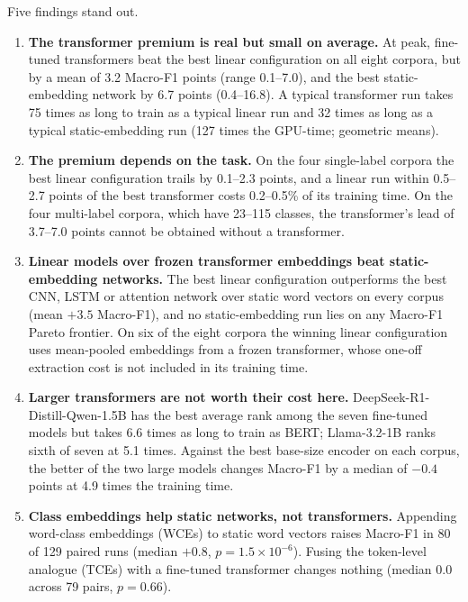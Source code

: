 \documentclass{ijis}
\begin{document}
Five findings stand out.
\begin{enumerate}
\setlength\itemsep{1pt}
\item \textbf{The transformer premium is real but small on average.} At peak, fine-tuned transformers beat the best linear configuration on all eight corpora, but by a mean of 3.2 Macro-F1 points (range 0.1--7.0), and the best static-embedding network by 6.7 points (0.4--16.8). A typical transformer run takes 75 times as long to train as a typical linear run and 32 times as long as a typical static-embedding run (127 times the GPU-time; geometric means).
\item \textbf{The premium depends on the task.} On the four single-label corpora the best linear configuration trails by 0.1--2.3 points, and a linear run within 0.5--2.7 points of the best transformer costs 0.2--0.5\% of its training time. On the four multi-label corpora, which have 23--115 classes, the transformer's lead of 3.7--7.0 points cannot be obtained without a transformer.
\item \textbf{Linear models over frozen transformer embeddings beat static-embedding networks.} The best linear configuration outperforms the best CNN, LSTM or attention network over static word vectors on every corpus (mean $+3.5$ Macro-F1), and no static-embedding run lies on any Macro-F1 Pareto frontier. On six of the eight corpora the winning linear configuration uses mean-pooled embeddings from a frozen transformer, whose one-off extraction cost is not included in its training time.
\item \textbf{Larger transformers are not worth their cost here.} DeepSeek-R1-Distill-Qwen-1.5B has the best average rank among the seven fine-tuned models but takes 6.6 times as long to train as BERT; Llama-3.2-1B ranks sixth of seven at 5.1 times. Against the best base-size encoder on each corpus, the better of the two large models changes Macro-F1 by a median of $-0.4$ points at 4.9 times the training time.
\item \textbf{Class embeddings help static networks, not transformers.} Appending word-class embeddings (WCEs) \cite{moreo2021} to static word vectors raises Macro-F1 in 80 of 129 paired runs (median $+0.8$, $p = 1.5\times10^{-6}$). Fusing the token-level analogue (TCEs) with a fine-tuned transformer changes nothing (median 0.0 across 79 pairs, $p = 0.66$).
\end{enumerate}
\end{document}
